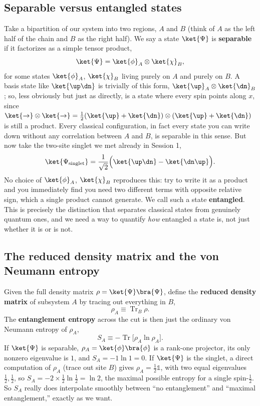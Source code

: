 \documentclass[all_sessions.tex]{subfiles}
\begin{document}
\subsection{Separable versus entangled states}
Take a bipartition of our system into two regions, $A$ and $B$ (think of $A$ as the left half of
the chain and $B$ as the right half). We say a state $\ket{\Psi}$ is \textbf{separable} if it
factorizes as a simple tensor product,
\begin{equation}
  \ket{\Psi} = \ket{\phi}_A \otimes \ket{\chi}_B,
\end{equation}
for some states $\ket{\phi}_A$, $\ket{\chi}_B$ living purely on $A$ and purely on $B$. A basis
state like $\ket{\up\dn}$ is trivially of this form, $\ket{\up}_A\otimes\ket{\dn}_B$; so, less
obviously but just as directly, is a state where every spin points along $x$, since
$\ket{\to}\otimes\ket{\to} = \tfrac12(\ket{\up}+\ket{\dn})\otimes(\ket{\up}+\ket{\dn})$ is still a
product. Every classical configuration, in fact every state you can write down without any
correlation between $A$ and $B$, is separable in this sense. But now take the two-site singlet we
met already in Session 1,
\begin{equation}
  \ket{\Psi_{\mathrm{singlet}}} = \frac{1}{\sqrt2}\Big(\ket{\up\dn} - \ket{\dn\up}\Big).
\end{equation}
No choice of $\ket{\phi}_A$, $\ket{\chi}_B$ reproduces this: try to write it as a product and you
immediately find you need two different terms with opposite relative sign, which a single product
cannot generate. We call such a state \textbf{entangled}. This is precisely the distinction that
separates classical states from genuinely quantum ones, and we need a way to quantify \emph{how}
entangled a state is, not just whether it is or is not.

\subsection{The reduced density matrix and the von Neumann entropy}
Given the full density matrix $\rho = \ket{\Psi}\bra{\Psi}$, define the \textbf{reduced density
matrix} of subsystem $A$ by tracing out everything in $B$,
\begin{equation}
  \rho_A \equiv \operatorname{Tr}_B\rho.
\end{equation}
The \textbf{entanglement entropy} across the cut is then just the ordinary von Neumann entropy of
$\rho_A$,
\begin{equation}
  S_A \equiv -\operatorname{Tr}\big[\rho_A \ln \rho_A\big].
  \label{eq:vonNeumann}
\end{equation}
If $\ket{\Psi}$ is separable, $\rho_A = \ket{\phi}\bra{\phi}$ is a rank-one projector, its only
nonzero eigenvalue is $1$, and $S_A = -1\ln 1 = 0$. If $\ket{\Psi}$ is the singlet, a direct
computation of $\rho_A$ (trace out site $B$) gives $\rho_A = \tfrac12\mathbb{1}$, with two equal
eigenvalues $\tfrac12,\tfrac12$, so $S_A = -2\times\tfrac12\ln\tfrac12 = \ln 2$, the maximal
possible entropy for a single spin-$\tfrac12$. So $S_A$ really does interpolate smoothly between
``no entanglement'' and ``maximal entanglement,'' exactly as we want.
\end{document}
